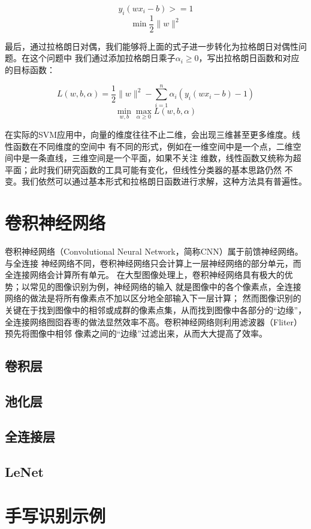 $$y_{i}\left(w x_{i}-b\right)>=1$$
$$\min \frac{1}{2}\|w\|^{2}$$

最后，通过拉格朗日对偶，我们能够将上面的式子进一步转化为拉格朗日对偶性问题。在这个问题中
我们通过添加拉格朗日乘子$\alpha_{i} \geq 0$，写出拉格朗日函数和对应的目标函数：

$$L(w, b, \alpha)=\frac{1}{2}\|w\|^{2}-\sum_{i=1}^{n} \alpha_{i}\left(y_{i}\left(w x_{i}-b\right)-1\right)$$
$$\min _{w, b} \max _{\alpha \geq 0} L(w, b, \alpha)$$

在实际的SVM应用中，向量的维度往往不止二维，会出现三维甚至更多维度。线性函数在不同维度的空间中
有不同的形式，例如在一维空间中是一个点，二维空间中是一条直线，三维空间是一个平面，如果不关注
维数，线性函数又统称为超平面；此时我们研究函数的工具可能有变化，但线性分类器的基本思路仍然
不变。我们依然可以通过基本形式和拉格朗日函数进行求解，这种方法具有普遍性。


\section{卷积神经网络}
卷积神经网络（Convolutional Neural Network，简称CNN）属于前馈神经网络。与全连接
神经网络不同，卷积神经网络只会计算上一层神经网络的部分单元，而全连接网络会计算所有单元。
在大型图像处理上，卷积神经网络具有极大的优势；以常见的图像识别为例，神经网络的输入
就是图像中的各个像素点，全连接网络的做法是将所有像素点不加以区分地全部输入下一层计算；
然而图像识别的关键在于找到图像中的相邻或成群的像素点集，从而找到图像中各部分的“边缘”，
全连接网络囫囵吞枣的做法显然效率不高。卷积神经网络则利用滤波器（Fliter）预先将图像中相邻
像素之间的“边缘”过滤出来，从而大大提高了效率。

\subsection{卷积层}
\subsection{池化层}
\subsection{全连接层}
\subsection{LeNet}
\section{手写识别示例}
